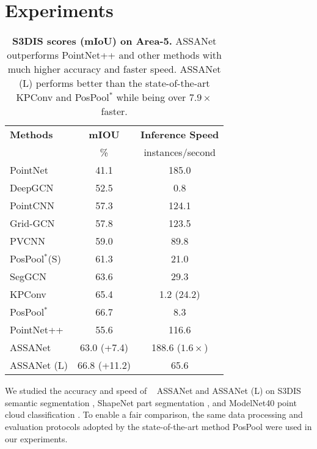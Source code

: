 \documentclass{article}
\newcommand{\R}[1]{\textcolor[rgb]{1.00,0.00,0.00}{#1}}
\begin{document}
 \section{Experiments}\label{sec:experiments}
\begin{wraptable}{r}{8cm}
\vspace{-20mm}
\centering
\begin{tabular}{lcc}
\midrule
\textbf{Methods} & \textbf{mIOU} & \textbf{Inference Speed} \\
& \% & instances/second \\
\midrule
PointNet \cite{Qi2017PointNetDL}	& 41.1 & 185.0 \\
DeepGCN \cite{Li2019DeepGCNs}    & 52.5 & 0.8 \\
PointCNN \cite{PointCNN}	   & 57.3 & 124.1 \\
Grid-GCN \cite{Xu2020GridGCNFF} & 57.8 & 123.5 \\ 
PVCNN \cite{Liu2019PointVoxelCF} & 59.0 & 89.8 \\
PosPool$^{*}$(S) \cite{Liu2020ACL}	& 61.3 & 21.0\\
SegGCN \cite{Lei2020SegGCNE3} & 63.6 & 29.3\\ 
KPConv \cite{Thomas2019KPConvFA} & 65.4 & 1.2 (24.2) \\
PosPool$^{*}$ \cite{Liu2020ACL}	& 66.7& 8.3\\
\midrule
PointNet++ \cite{Qi2017PointNetDH}	&  55.6 & 116.6 \\
ASSANet & 63.0 \R{(+7.4)} & 188.6 \R{($1.6 \times$)}\\
ASSANet (L) & 66.8 \R{(+11.2)} & 65.6\\
\bottomrule
\end{tabular}
\caption{\textbf{S3DIS scores (mIoU) on Area-5.} ASSANet outperforms PointNet++ and other methods with much higher accuracy and faster speed. ASSANet (L) performs better than the state-of-the-art KPConv \cite{Thomas2019KPConvFA} and PosPool$^{*}$ \cite{Liu2020ACL} while being over $7.9 \times$ faster. 
}
\label{tab:s3dis_sota}
\vspace{-10mm}
\end{wraptable}
We studied the accuracy and speed of ~ ASSANet and ASSANet (L) on S3DIS semantic segmentation \cite{s3dis}, ShapeNet part segmentation \cite{shapenet2015}, and ModelNet40 point cloud classification \cite{ben20183dmfv}. To enable a fair comparison, the same data processing and evaluation protocols adopted by the state-of-the-art method PosPool  \cite{Liu2020ACL} were used in our experiments.
\end{document}
